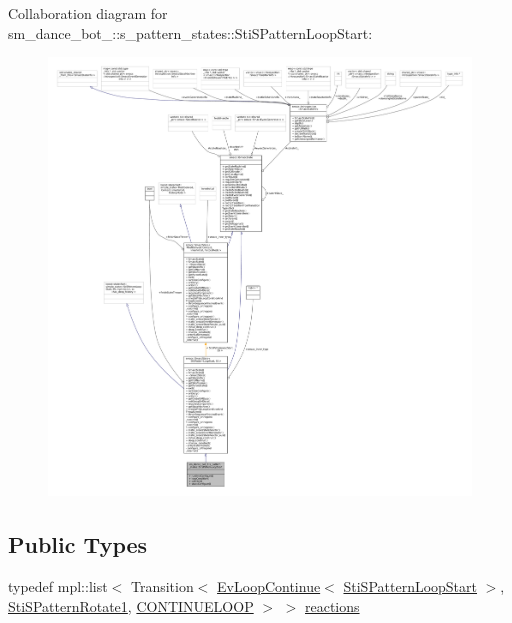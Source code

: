 Collaboration diagram for sm\+\_\+dance\+\_\+bot\+\_\+:\+:s\+\_\+pattern\+\_\+states\+:\+:Sti\+S\+Pattern\+Loop\+Start\+:
\nopagebreak
\begin{figure}[H]
\begin{center}
\leavevmode
\includegraphics[width=350pt]{structsm__dance__bot__2_1_1s__pattern__states_1_1StiSPatternLoopStart__coll__graph}
\end{center}
\end{figure}
\subsection*{Public Types}
\begin{DoxyCompactItemize}
\item 
typedef mpl\+::list$<$ Transition$<$ \hyperlink{structsmacc_1_1default__events_1_1EvLoopContinue}{Ev\+Loop\+Continue}$<$ \hyperlink{structsm__dance__bot__2_1_1s__pattern__states_1_1StiSPatternLoopStart}{Sti\+S\+Pattern\+Loop\+Start} $>$, \hyperlink{structsm__dance__bot__2_1_1s__pattern__states_1_1StiSPatternRotate1}{Sti\+S\+Pattern\+Rotate1}, \hyperlink{structsmacc_1_1default__transition__tags_1_1CONTINUELOOP}{C\+O\+N\+T\+I\+N\+U\+E\+L\+O\+OP} $>$ $>$ \hyperlink{structsm__dance__bot__2_1_1s__pattern__states_1_1StiSPatternLoopStart_a4d68e23acfe5431bdc2c450aef851e6e}{reactions}
\end{DoxyCompactItemize}
